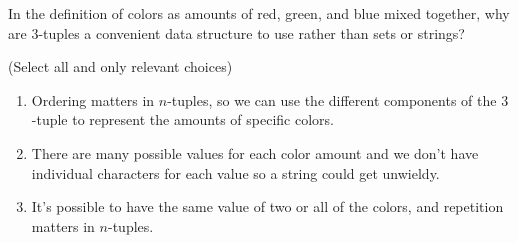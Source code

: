 

In the definition of colors as amounts of red, green, and blue mixed together, why are $3$-tuples a convenient data structure to use rather than sets or strings?

(Select all and only relevant choices)

\begin{enumerate}
\item Ordering matters in $n$-tuples, so we can use the different components of the $3$-tuple to represent the amounts of specific colors. 
\item There are many possible values for each color amount and we don't have individual characters for each value so a string could get unwieldy.
\item It's possible to have the same value of two or all of the colors, and repetition matters in $n$-tuples.
\end{enumerate}
\vfill